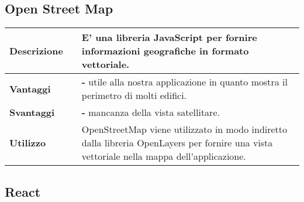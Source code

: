 \newpage
\subsection{Open Street Map}
\label{Open Street Map}
\begin{table}[H]
	\centering
	\begin{tabular}{p{2cm}p{0.5cm}p{11.5cm}}
		\arrayrulecolor{lightgray}
		\toprule
		\textbf{Descrizione} & &
		E' una libreria JavaScript per fornire informazioni geografiche in formato vettoriale.
		\\ \midrule
		\textbf{Vantaggi} & &
		\textbf{- }utile alla nostra applicazione in quanto mostra il perimetro di molti edifici.
		\\ \midrule
		\textbf{Svantaggi} & &
		\textbf{- }mancanza della vista satellitare.
		\\ \midrule
		\textbf{Utilizzo} & &
		OpenStreetMap viene utilizzato in modo indiretto dalla libreria OpenLayers per fornire una vista
		vettoriale nella mappa dell’applicazione.
		\\\bottomrule
	\end{tabular}
\end{table}





\vspace{40px}
\subsection{React}
\label{React}


